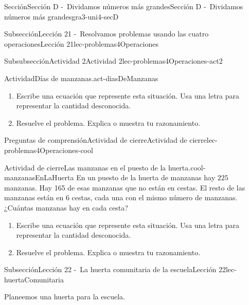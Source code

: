 \documentclass[twoside,10pt,]{article}
\begin{document}
\begin{sectionptx}{Sección}{Sección D -~Dividamos números más grandes}{}{Sección D -~Dividamos números más grandes}{}{}{gra3-uni4-secD}
\begin{subsectionptx}{Subsección}{Lección 21 -~Resolvamos problemas usando las cuatro operaciones}{}{Lección 21}{}{}{lec-problemas4Operaciones}
\begin{subsubsectionptx}{Subsubsección}{Actividad 2}{}{Actividad 2}{}{}{lec-problemas4Operaciones-act2}
\begin{activity}{Actividad}{Días de manzanas.}{act-diasDeManzanas}
\begin{enumerate}
%
\begin{enumerate}
\item{}Escribe una ecuación que represente esta situación. Usa una letra para representar la cantidad desconocida.%
\item{}Resuelve el problema. Explica o muestra tu razonamiento.%
\end{enumerate}
\end{enumerate}
\end{activity}%
%
\end{subsubsectionptx}
%
%
\typeout{************************************************}
\typeout{************************************************}
%
\begin{reading-questions-subsubsection}{Preguntas de comprensión}{Actividad de cierre}{}{Actividad de cierre}{}{}{lec-problemas4Operaciones-cool}
\begin{project}{Actividad de cierre}{Las manzanas en el puesto de la huerta.}{cool-manzanasEnLaHuerta}%
En un puesto de la huerta de manzanas hay \(225\) manzanas. Hay 165 de esas manzanas que no están en cestas. El resto de las manzanas están en \(6\) cestas, cada una con el mismo número de manzanas. ¿Cuántas manzanas hay en cada cesta?%
%
\begin{enumerate}[label={(\alph*)}]
\item{}Escribe una ecuación que represente esta situación. Usa una letra para representar la cantidad desconocida.%
\item{}Resuelve el problema. Explica o muestra tu razonamiento.%
\end{enumerate}
\end{project}%
\end{reading-questions-subsubsection}
\end{subsectionptx}
%
%
\typeout{************************************************}
\typeout{************************************************}
%
\begin{subsectionptx}{Subsección}{Lección 22 -~La huerta comunitaria de la escuela}{}{Lección 22}{}{}{lec-huertaComunitaria}
\begin{introduction}{}%
Planeemos una huerta para la escuela.%
\end{introduction}%
%
%
\typeout{************************************************}

\end{subsectionptx}
\end{sectionptx}
\end{document}
